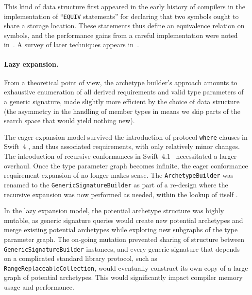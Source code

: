 \documentclass[../generics]{subfiles}
\begin{document}
This kind of data structure first appeared in the early history of compilers in the implementation of ``\texttt{EQUIV} statements'' for declaring that two symbols ought to share a storage location. These statements thus define an equivalence relation on symbols, and the performance gains from a careful implementation were noted in~\cite{improvedequivalence}. A survey of later techniques appears in~\cite{unionfindsurvey}.

\paragraph{Lazy expansion.}
From a theoretical point of view, the archetype builder's approach amounts to exhaustive enumeration of all derived requirements and valid type parameters of a generic signature, made slightly more efficient by the choice of data structure (the asymmetry in the handling of member types in  means we skip parts of the search space that would yield nothing new).

The eager expansion model survived the introduction of protocol \texttt{where} clauses in Swift~4 \cite{se0142}, and thus associated requirements, with only relatively minor changes. The introduction of recursive conformances in Swift~4.1~\cite{se0157} necessitated a larger overhaul. Once the type parameter graph becomes infinite, the eager conformance requirement expansion of  no longer makes sense. The \texttt{ArchetypeBuilder} was renamed to the \texttt{GenericSignatureBuilder} as part of a re-design where the recursive expansion was now performed as needed, within the lookup of  itself \cite{implrecursive}.

In the lazy expansion model, the potential archetype structure was highly mutable, as generic signature queries would create new potential archetypes and merge existing potential archetypes while exploring new subgraphs of the type parameter graph. The on-going mutation prevented sharing of structure between \texttt{GenericSignatureBuilder} instances, and every generic signature that depends on a complicated standard library protocol, such as \texttt{RangeReplaceableCollection}, would eventually construct its own copy of a large graph of potential archetypes. This would significantly impact compiler memory usage and performance.
\end{document}
